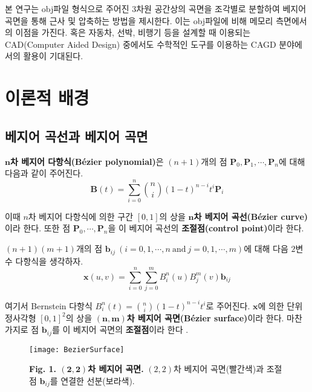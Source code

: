 \documentclass{Humantech_Paper_Awardfullpaper_hutech}
\begin{document}
본 연구는 obj파일 형식으로 주어진 3차원 공간상의 곡면을 조각별로 분할하여 베지어 곡면을 통해 근사 및 압축하는 방법을 제시한다. 이는 obj파일에 비해 메모리 측면에서의 이점을 가진다. 혹은 자동차, 선박, 비행기 등을 설계할 때 이용되는 CAD(Computer Aided Design) 중에서도 수학적인 도구를 이용하는 CAGD 분야에서의 활용이 기대된다. 
	
\section{이론적 배경}
\subsection{베지어 곡선과 베지어 곡면}
\begin{defn}
	\textbf{$\bm{n}$차 베지어 다항식(Bézier polynomial)}은 $(n+1)$개의 점 $\mathbf{P}_0, \mathbf{P}_1, \cdots, \mathbf{P}_n$에 대해 다음과 같이 주어진다.
	\begin{equation} \label{BezierCurve}
		\mathbf{B}(t)=\sum_{i=0}^n \binom ni(1-t)^{n-i}t^i\mathbf{P}_i
	\end{equation}
	
	\noindent 이때 $n$차 베지어 다항식에 의한 구간 $[0, 1]$의 상을 \textbf{$\boldsymbol{n}$차 베지어 곡선(Bézier curve)}이라 한다. 또한 점 $\mathbf{P}_0, \cdots, \mathbf{P}_n$을 이 베지어 곡선의 \textbf{조절점(control point)}이라 한다. 
\end{defn}

\begin{defn}
	$(n+1)(m+1)$개의 점 $\mathbf{b}_{ij}\ (i = 0, 1, \cdots, n \ \text{and} \ j = 0, 1, \cdots, m)$에 대해 다음 $2$변수 다항식을 생각하자. 
	\begin{equation} \label{BezierSurface}
		\mathbf{x}(u, v)=\sum_{i=0}^n\sum_{j=0}^m B_i^n(u)B_j^m(v)\mathbf{b}_{ij} 
	\end{equation}

	여기서 Bernstein 다항식 $B_i^n(t)=\binom ni(1-t)^{n-i}t^i$로 주어진다. $\mathbf{x}$에 의한 단위 정사각형 $[0, 1]^2$의 상을 \textbf{$\bm{(n, m)}$차 베지어 곡면(Bézier surface)}이라 한다. 마찬가지로 점 $\mathbf{b}_{ij}$를 이 베지어 곡면의 \textbf{조절점}이라 한다 \cite{Farin}.
\end{defn}

\begin{figure}[h]
	\begin{center}
{\tiny }		\texttt{[image: BezierSurface]}
	\end{center} 
	\raggedright \small \textbf{Fig. 1. $\bm{(2, 2)}$차 베지어 곡면.} $(2, 2)$차 베지어 곡면(빨간색)과 조절점 $\mathbf{b}_{ij}$를 연결한 선분(보라색).
\end{figure}
\end{document}
